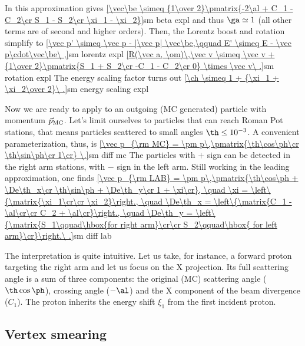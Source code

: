 In this approximation  gives
\eqref{\vec\be \simeq {1\over 2}\pmatrix{-2\al + C_1 - C_2\cr S_1 - S_2\cr \xi_1 - \xi_2}}{sm beta expl}
and thus $\ga\simeq 1$ (all other terms are of second and higher orders). Then, the Lorentz boost  and rotation  simplify to
\eqref{\vec p' \simeq \vec p - |\vec p| \vec\be,\qquad E' \simeq E - \vec p\cdot\vec\be\ ,}{sm lorentz expl}
\eqref{R(\vec a, \om)\,\vec v \simeq \vec v + {1\over 2}\pmatrix{S_1 + S_2\cr -C_1 - C_2\cr 0} \times \vec v\ .}{sm rotation expl}
The energy scaling factor turns out
\eqref{\ch \simeq 1 + {\xi_1 + \xi_2\over 2}\ .}{sm energy scaling expl}

Now we are ready to apply  to an outgoing (MC generated) particle with momentum $\vec p_{\rm MC}$. Let's limit ourselves to particles that can reach Roman Pot stations, that means particles scattered to small angles $\th \leq 10^{-3}$. A convenient parameterization, thus, is
\eqref{\vec p_{\rm MC} = \pm p\,\pmatrix{\th\cos\ph\cr \th\sin\ph\cr 1\cr} \.}{sm diff mc}
The particles with $+$ sign can be detected in the right arm stations, with $-$ sign in the left arm. Still working in the leading approximation, one finds
\eqref{\vec p_{\rm LAB} = \pm p\,\pmatrix{\th\cos\ph + \De\th_x\cr \th\sin\ph + \De\th_y\cr 1 + \xi\cr},
\quad \xi = \left\{\matrix{\xi_1\cr\cr \xi_2}\right.,
\quad \De\th_x = \left\{\matrix{C_1 - \al\cr\cr C_2 + \al\cr}\right.,
\quad \De\th_y = \left\{\matrix{S_1\qquad\hbox{for right arm}\cr\cr S_2\qquad\hbox{ for left arm}\cr}\right.\ .}{sm diff lab} %

The interpretation is quite intuitive. Let us take, for instance, a forward proton targeting the right arm and let us focus on the X projection. Its full scattering angle is a sum of three components: the original (MC) scattering angle ($\th\cos\ph$), crossing angle ($-\al$) and the X component of the beam divergence ($C_1$). The proton inherits the energy shift $\xi_1$ from the first incident proton.

\iffalse
Using the statistical properties suggested in the previous section yields the following relation between variances (recalling $\si_\th$ refers to the beam divergence)
\eqref{\si_{\De\th_x} = \si_{\De\th_y} = \si_{C_1} = \si_{C_2} = \si_{S_1} = \si_{S_2} = \cases{
{\si_\th\over\sqrt2}\qquad\hbox{for parameterization \Eq{mom par 1}}\cr
\si_\th\qquad\hbox{for parameterization \Eq{mom par 2}}\cr
}\ .}{delta th sigma}
\fi


\subsection{Vertex smearing}

